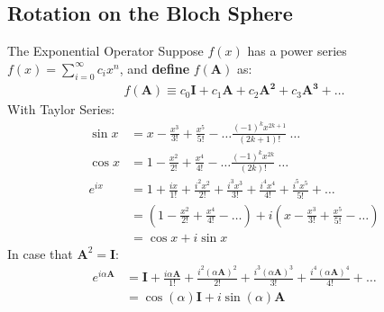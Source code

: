 \documentclass{beamer}
\begin{document}
\subsection{Rotation on the Bloch Sphere}
\begin{frame}{The Exponential Operator\tiny\cite{rotationsonblochsphere}}
  {\tiny
    Suppose $f(x)$ has a power series $f(x) = \sum_{i=0}^{\infty}c_ix^n$, and \textbf{define} $f(\mathbf{A})$ as:
    \begin{align*}
    f(\mathbf{A}) \equiv c_0\mathbf{I} + c_1\mathbf{A} + c_2\mathbf{A^2} + c_3\mathbf{A^3} + \dots
    \end{align*}
    With Taylor Series:
    \begin{align*}
      \sin{x} &= x - \frac{x^3}{3!} + \frac{x^5}{5!} - \dots \frac{(-1)^kx^{2k+1}}{(2k+1)!}\ \dots \\
      \cos{x} &= 1 - \frac{x^2}{2!} + \frac{x^4}{4!} - \dots \frac{(-1)^kx^{2k}}{(2k)!}\ \dots \\
      e^{ix} &= 1 + \frac{ix}{1!} + \frac{i^2x^2}{2!} + \frac{i^3x^3}{3!}+ \frac{i^4x^4}{4!} + \frac{i^5x^5}{5!} + \dots \\
             &= (1 - \frac{x^2}{2!} + \frac{x^4}{4!} - \dots) + i(x - \frac{x^3}{3!} + \frac{x^5}{5!} - \dots) \\
             &= \cos{x} + i\sin{x}
    \end{align*}
    In case that $\mathbf{A}^2=\mathbf{I}$:
    \begin{align*}
      e^{i\alpha\mathbf{A}} &= \mathbf{I}
                                 + \frac{i\alpha\mathbf{A}}{1!}
                                 + \frac{i^2(\alpha\mathbf{A})^2}{2!}
                                 + \frac{i^3(\alpha\mathbf{A})^3}{3!}
                                 + \frac{i^4(\alpha\mathbf{A})^4}{4!}
                                 + \dots \\
                            &= \cos(\alpha)\mathbf{I} + i\sin(\alpha)\mathbf{A}
    \end{align*}
  }%
\end{frame}
\end{document}
